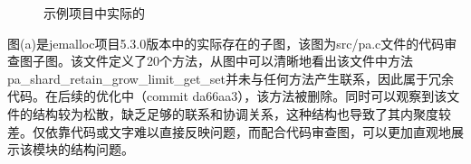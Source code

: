 \begin{figure}[!h]
    \setlength{\subfigcapskip}{-1bp}
    \centering
    \begin{minipage}{\textwidth}
    \centering
    \hspace{2em}
    \end{minipage}
    \centering
    \begin{minipage}{\textwidth}
    \centering
    \hspace{2em}
    \end{minipage}
    \vspace{0.2em}
    \caption{示例项目中实际的} %
\end{figure}



图(a)是jemalloc项目5.3.0版本中的实际存在的子图，该图为src/pa.c文件的代码审查图子图。该文件定义了20个方法，从图中可以清晰地看出该文件中方法pa\_shard\_retain\_grow\_limit\_get\_set并未与任何方法产生联系，因此属于冗余代码。在后续的优化中（commit da66aa3），该方法被删除。同时可以观察到该文件的结构较为松散，缺乏足够的联系和协调关系，这种结构也导致了其内聚度较差。仅依靠代码或文字难以直接反映问题，而配合代码审查图，可以更加直观地展示该模块的结构问题。

